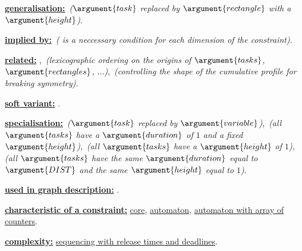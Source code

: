 \begin{ctrdesc}
\hyperlink{Lgeneralisation}{{\bf generalisation:}}
\hyperlink{Ccumulative_two_d}{}\,\emph{($\argument{task}$ replaced by $\argument{rectangle}$ with a $\argument{height}$)}.

\hyperlink{Limplied_by}{{\bf implied by:}}
\hyperlink{Cdiffn}{}\,\emph{(\hyperlink{Ccumulative}{} is a neccessary condition for each dimension of the \hyperlink{Cdiffn}{} constraint)}.

\hyperlink{Lrelated}{{\bf related:}}
\hyperlink{Clex_chain_less}{},
\hyperlink{Clex_chain_lesseq}{}\,\emph{(lexicographic ordering on the origins of $\argument{tasks}$, $\argument{rectangles}$, $\ldots$)},
\hyperlink{Cordered_global_cardinality}{}\,\emph{(controlling the shape of the cumulative profile for breaking symmetry)}.

\hyperlink{Lsoft_variant}{{\bf soft variant:}}
\hyperlink{Csoft_cumulative}{}.

\hyperlink{Lspecialisation}{{\bf specialisation:}}
\hyperlink{Catmost}{}\,\emph{($\argument{task}$ replaced by $\argument{variable}$)},
\hyperlink{Cbin_packing}{}\,\emph{(all $\argument{tasks}$ have a $\argument{duration}$ of $1$ and a fixed $\argument{height}$)},
\hyperlink{Cdisjunctive}{}\,\emph{(all $\argument{tasks}$ have a $\argument{height}$ of $1$)},
\hyperlink{Cmulti_inter_distance}{}\,\emph{(all $\argument{tasks}$ have the same $\argument{duration}$ equal to $\argument{DIST}$ and the same $\argument{height}$ equal to $1$)}.

\hyperlink{Lused_in_graph_description}{{\bf used in graph description:}}
\hyperlink{Csum_ctr}{}.

\item[\pdfmarkup{subject={Keywords},color=white,markup=Highlight}{Keywords}{Related keywords grouped by meta-keywords.}
]
\hyperlink{characteristic_of_a_constraint}{{\bf characteristic of a constraint:}}
\hyperlink{core}{core},
\hyperlink{automaton}{automaton},
\hyperlink{automaton_with_array_of_counters}{automaton with array of counters}.
 
\hyperlink{complexity}{{\bf complexity:}}
\hyperlink{sequencing_with_release_times_and_deadlines}{sequencing with release times and deadlines}.
 

\end{ctrdesc}
